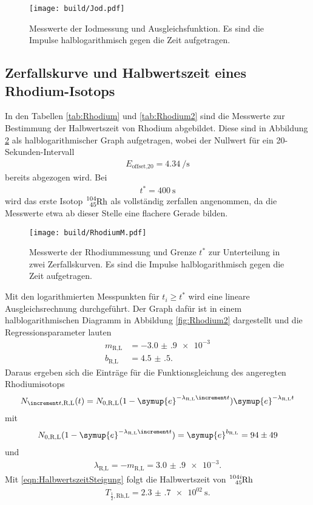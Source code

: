 \begin{figure}
  \centering
  \texttt{[image: build/Jod.pdf]}
  \caption{Messwerte der Iodmessung und Ausgleichsfunktion. Es sind
  die Impulse halblogarithmisch gegen die Zeit aufgetragen.}
  \label{fig:Iod}
\end{figure}

\FloatBarrier

\subsection{Zerfallskurve und Halbwertszeit eines Rhodium-Isotops}

In den Tabellen \ref{tab:Rhodium} und \ref{tab:Rhodium2} sind die Messwerte
zur Bestimmung der Halbwertszeit von Rhodium abgebildet.
Diese sind in Abbildung \ref{fig:RhodiumM} als halblogarithmischer Graph
aufgetragen, wobei der Nullwert für ein 20-Sekunden-Intervall
\begin{align}
  E_\text{offset,20} = \SI{4.34}{\per\second}
\end{align}
bereits abgezogen wird.
Bei
\begin{align}
  t^* = \SI{400}{\second}
\end{align}
wird das erste Isotop $\ce{^{104}_{45}Rh}$ als vollständig zerfallen angenommen, da die
Messwerte etwa ab dieser Stelle eine flachere Gerade bilden.

\begin{figure}
  \centering
  \texttt{[image: build/RhodiumM.pdf]}
  \caption{Messwerte der Rhodiummessung und Grenze $t^*$ zur Unterteilung in
  zwei Zerfallskurven. Es sind die Impulse halblogarithmisch gegen die Zeit
  aufgetragen.}
  \label{fig:RhodiumM}
\end{figure}

\FloatBarrier

Mit den logarithmierten Messpunkten für $t_i \geq t^*$ wird eine
lineare Ausgleichsrechnung durchgeführt.
Der Graph dafür ist in einem halblogarithmischen Diagramm in Abbildung
\ref{fig:Rhodium2} dargestellt und die Regressionsparameter lauten
\begin{align}
  m_\text{R,L} & = -\num{3.0(9)e-3} \\
  b_\text{R,L} & = \num{4.5(5)}.
\end{align}
Daraus ergeben sich die Einträge für die Funktionsgleichung des angeregten
Rhodiumisotops
\begin{align}
  N_{\increment t,\text{R,L}} (t) = N_\text{0,R,L}(1-
  \symup{e}^{-\lambda_\text{R,L}\increment t})\symup{e}^{-\lambda_\text{R,L}t}
  \label{eqn:RhodiumL}
\end{align}
mit
\begin{align}
  N_\text{0,R,L}(1-\symup{e}^{-\lambda_\text{R,L}\increment t}) =
  \symup{e}^{b_\text{R,L}} = \num{94(49)}
\end{align}
und
\begin{align}
  \lambda_\text{R,L} = -m_\text{R,L} = \num{3.0(9)e-3}.
\end{align}
Mit \eqref{eqn:HalbwertszeitSteigung} folgt die Halbwertszeit von $\ce{^{104i}_{45}Rh}$
\begin{align}
  T_{\frac{1}{2},\text{Rh,L}} = \SI{2.3(7)e02}{\second}.
\end{align}

